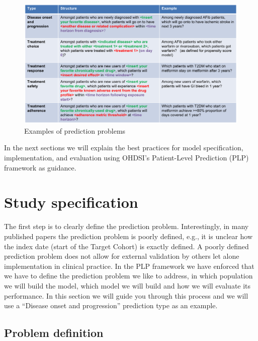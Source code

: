 \documentclass[]{book}
\begin{document}
\begin{figure}
\includegraphics[width=1\linewidth]{images/PatientLevelPrediction/problems} \caption{Examples of prediction problems}\label{fig:problems}
\end{figure}

In the next sections we will explain the best practices for model
specification, implementation, and evaluation using OHDSI's
Patient-Level Prediction (PLP) framework as guidance.

\section{Study specification}\label{study-specification}

The first step is to clearly define the prediction problem.
Interestingly, in many published papers the prediction problem is poorly
defined, e.g., it is unclear how the index date (start of the Target
Cohort) is exactly defined. A poorly defined prediction problem does not
allow for external validation by others let alone implementation in
clinical practice. In the PLP framework we have enforced that we have to
define the prediction problem we like to address, in which population we
will build the model, which model we will build and how we will evaluate
its performance. In this section we will guide you through this process
and we will use a ``Disease onset and progression'' prediction type as
an example.

\subsection{Problem definition}\label{problem-definition}
\end{document}
